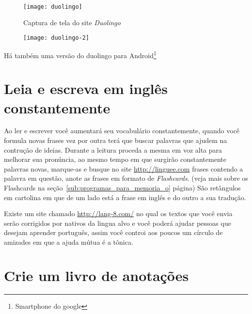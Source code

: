 \begin{figure}[h!]
	\centering
	\caption{Captura de tela do site {\em Duolingo}}
	\texttt{[image: duolingo]} \\
\end{figure}

\begin{figure}[h!]
	\centering
	\texttt{[image: duolingo-2]}
\end{figure}

\vspace{0.3\baselineskip}
{\footnotesize {}  Há também uma versão do duolingo para Android\footnote{Smartphone do google}}

\section{Leia e escreva em inglês constantemente}
\label{sec:leia_e_escreva_em_ingl_s_constantemente}

Ao ler e escrever você aumentará seu vocabulário constantemente,
quando você formula novas frases vez por outra terá que buscar
palavras que ajudem na contrução de ideias. Durante a leitura proceda
a mesma em voz alta para melhorar sua pronúncia, ao mesmo tempo em que
surgirão constantemente palavras novas, marque-as e busque no site
\href{http://linguee.com}{http://linguee.com} frases contendo a
palavra em questão, anote as frases em formato de \emph{Flashcards}.
(veja mais sobre os Flashcards na
seção~\ref{sub:programas_para_memoria_o}
página\pageref{sub:programas_para_memoria_o})  São retângulos em
cartolina em que de um lado está a frase em inglês e do outro a sua
tradução.

Existe um site chamado \href{http://lang-8.com/}{http://lang-8.com/}
no qual os textos que você envia serão corrigidos por nativos da
lingua alvo e você poderá ajudar pessoas que desejam aprender
português, assim você controi aos poucos um círculo de amizades em que
a ajuda mútua é a tônica.


\section{Crie um livro de anotações}\label{sec:evernote}

